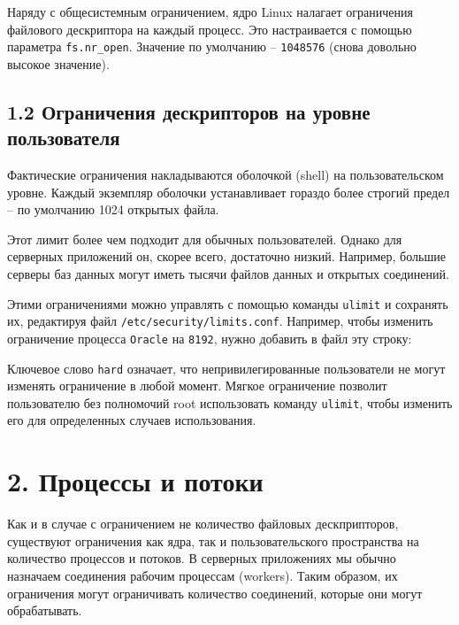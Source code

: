 Наряду с общесистемным ограничением, ядро Linux налагает ограничения файлового дескриптора на каждый процесс. Это настраивается с помощью параметра \texttt{fs.nr\_open}. Значение по умолчанию -- \texttt{1048576} (снова довольно высокое значение).

\subsection*{1.2 Ограничения дескрипторов на уровне пользователя}

Фактические ограничения накладываются оболочкой (shell) на пользовательском уровне. Каждый экземпляр оболочки устанавливает гораздо более строгий предел -- по умолчанию 1024 открытых файла.

Этот лимит более чем подходит для обычных пользователей. Однако для серверных приложений он, скорее всего, достаточно низкий. Например, большие серверы баз данных могут иметь тысячи файлов данных и открытых соединений.

Этими ограничениями можно управлять с помощью команды \texttt{ulimit} и сохранять их, редактируя файл \texttt{/etc/security/limits.conf}. Например, чтобы изменить ограничение процесса \texttt{Oracle} на \texttt{8192}, нужно добавить в файл эту строку:


Ключевое слово \texttt{hard} означает, что непривилегированные пользователи не могут изменять ограничение в любой момент. Мягкое ограничение позволит пользователю без полномочий root использовать команду \texttt{ulimit}, чтобы изменить его для определенных случаев использования.

\section*{2. Процессы и потоки}

Как и в случае с ограничением не количество файловых дескприпторов, существуют ограничения как ядра, так и пользовательского пространства на количество процессов и потоков. В серверных приложениях мы обычно назначаем соединения рабочим процессам (workers). Таким образом, их ограничения могут ограничивать количество соединений, которые они могут обрабатывать.

